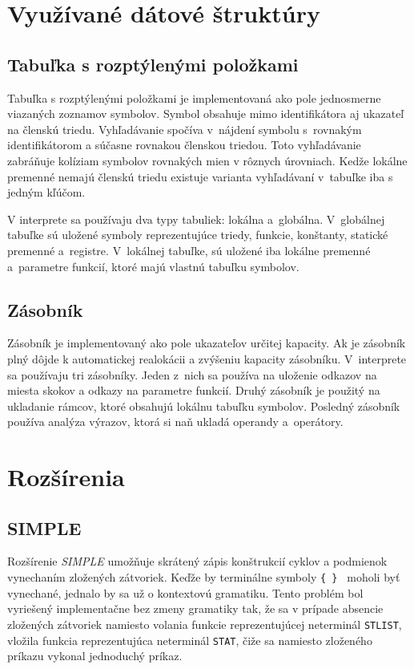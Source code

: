 \documentclass[11pt,a4paper]{article}
\begin{document}
	\section{Využívané dátové štruktúry}
	\label{struktury}

	\subsection{Tabuľka s rozptýlenými položkami}
	Tabuľka s rozptýlenými položkami je implementovaná ako pole jednosmerne
	viazaných zoznamov symbolov. Symbol obsahuje
	mimo identifikátora aj ukazateľ na členskú triedu. Vyhľadávanie spočíva
	v~nájdení symbolu s~rovnakým identifikátorom
	a súčasne rovnakou členskou triedou. Toto vyhľadávanie zabráňuje kolíziam
	symbolov rovnakých mien v rôznych úrovniach.
	Kedže lokálne premenné nemajú členskú triedu existuje varianta vyhľadávaní v~tabuľke
	iba s jedným kľúčom.

	V interprete sa používaju dva typy tabuliek: lokálna a~globálna. V~globálnej
	tabuľke sú uložené symboly reprezentujúce triedy, funkcie, konštanty, statické
	premenné a~registre. V~lokálnej tabuľke, sú uložené iba lokálne premenné a~parametre
	funkcií, ktoré majú vlastnú tabuľku symbolov.

	\subsection{Zásobník}
	Zásobník je implementovaný ako pole ukazateľov určitej kapacity. Ak je zásobník
	plný dôjde k automatickej realokácii a zvýšeniu kapacity zásobníku.
	V~interprete sa používaju tri zásobníky. Jeden z~nich sa používa na uloženie
	odkazov na miesta skokov a odkazy na parametre funkcií. Druhý zásobník je
	použitý na ukladanie rámcov, ktoré obsahujú lokálnu tabuľku symbolov.
	Posledný zásobník používa analýza výrazov, ktorá si naň ukladá operandy a~operátory.

	\section{Rozšírenia}
	\label{rozsirenia}

	\subsection{SIMPLE}
	Rozšírenie \emph{SIMPLE} umožňuje skrátený zápis konštrukcií cyklov a
	podmienok vynechaním zložených zátvoriek. Keďže by terminálne symboly
	\texttt{\{ \} } moholi byť vynechané, jednalo by sa už o kontextovú gramatiku.
	Tento problém bol vyriešený implementačne bez zmeny
	gramatiky tak, že sa v prípade absencie zložených zátvoriek namiesto volania
	funkcie reprezentujúcej neterminál \texttt{STLIST}, vložila
	funkcia reprezentujúca neterminál \texttt{STAT}, čiže sa namiesto zloženého
	príkazu vykonal jednoduchý príkaz.
\end{document}
